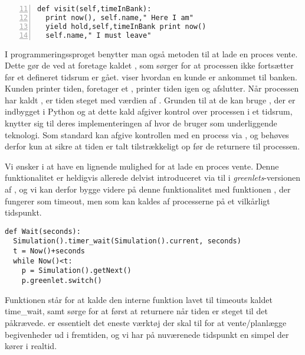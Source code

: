 \begin{lstlisting}[firstnumber=11 , stepnumber=2, numbers=left,float=hbtp, label=fig:simpy:yield, caption= Et yield i \simpy (Taget fra Bank05.py i eksemplet fra \simpy)] 
def visit(self,timeInBank): 
  print now(), self.name," Here I am" 
  yield hold,self,timeInBank print now()
  self.name," I must leave" 
\end{lstlisting}
I programmeringssproget \simpy benytter man også metoden til at lade en proces vente. Dette gør de ved at
foretage kaldet , som sørger for at processen ikke
fortsætter før et defineret tidsrum er gået.  viser hvordan en kunde er ankommet til banken. Kunden printer tiden, foretager et , printer tiden igen og afslutter.  Når processen har kaldt , er tiden steget med værdien af . Grunden til at de kan bruge , der er indbygget i Python og at dette kald afgiver kontrol over processen i et tidsrum, knytter sig til deres implementeringen af \simpy hvor de bruger   som underliggende teknologi. Som standard kan   afgive kontrollen med en process via , og \simpy behøves derfor kun at sikre at tiden er talt tilstrækkeligt op før de returnere til processen.

 Vi ønsker i \pycsp at have en lignende mulighed for at lade en proces vente. Denne funktionalitet er heldigvis allerede delvist introduceret via  til  i \emph{greenlets}-versionen af \pycsp, og vi kan derfor bygge videre på denne funktionalitet med funktionen , der fungerer som timeout, men som kan kaldes af processerne på et vilkårligt tidspunkt.
\begin{lstlisting}[firstnumber=20,float=hbtp, label=fig:wait, caption=Wait i \code{simulering}-versionen.] 
def Wait(seconds):
  Simulation().timer_wait(Simulation().current, seconds)
  t = Now()+seconds
  while Now()<t:
    p = Simulation().getNext() 
    p.greenlet.switch()
\end{lstlisting}

Funktionen  står for at kalde den interne funktion lavet til timeouts kaldet time\_wait, samt sørge for at først at returnere når tiden er steget til det påkrævede.  er essentielt det eneste værktøj der skal til for at vente/planlægge begivenheder ud i fremtiden, og vi har på nuværenede tidspunkt en simpel \des der kører i realtid. 

